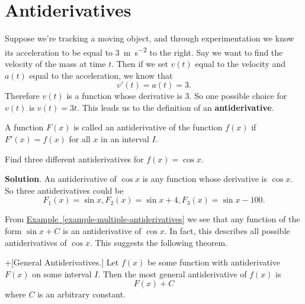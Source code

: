 \documentclass[10pt,]{book}
\newcommand{\terminology}[1]{\textbf{#1}}
\theoremstyle{ptxplainnotitle}
\theoremstyle{ptxplaintitle}
\theoremstyle{ptxplainnotitle}
\theoremstyle{ptxplaintitle}
\theoremstyle{ptxplainnotitle}
\theoremstyle{ptxplaintitle}
\theoremstyle{ptxdefinitionnotitle}
\theoremstyle{ptxdefinitiontitle}
\theoremstyle{ptxdefinitionnotitle}
\theoremstyle{ptxdefinitiontitle}
\theoremstyle{ptxdefinitionnotitle}
\theoremstyle{ptxdefinitiontitle}
\theoremstyle{ptxdefinitionnotitle}
\theoremstyle{ptxdefinitiontitle}
\theoremstyle{ptxdefinitionnotitle}
\theoremstyle{ptxdefinitiontitle}
\numberwithin{equation}{section}
\begin{document}
\section[{Antiderivatives}]{Antiderivatives}\label{section-antiderivatives}
\hypertarget{p-377}{}%
Suppose we're tracking a moving object, and through experimentation we know its acceleration to be equal to \SI{3}{\meter\per\second\tothe{2}} to the right. Say we want to find the velocity of the mass at time \(t\). Then if we set \(v(t)\) equal to the velocity and \(a(t)\) equal to the acceleration, we know that%
\begin{equation*}
v'(t) = a(t) = 3.
\end{equation*}
Therefore \(v(t)\) is a function whose derivative is \(3\). So one possible choice for \(v(t)\) is \(v(t) = 3t\). This leads us to the definition of an \terminology{antiderivative}.%
\begin{definition}[{Antiderivatives.}]\label{definition-antiderivatives}
\hypertarget{p-378}{}%
A function \(F(x)\) is called an antiderivative of the function \(f(x)\) if \(F'(x) = f(x)\) for all \(x\) in an interval \(I\).%
\end{definition}
\begin{example}\label{example-multiple-antiderivatives}
\hypertarget{p-379}{}%
Find three different antiderivatives for \(f(x) = \cos x\).%
\par\smallskip%
\noindent\textbf{Solution}.\hypertarget{solution-84}{}\quad%
\hypertarget{p-380}{}%
An antiderivative of \(\cos x\) is any function whose derivative is \(\cos x\). So three antiderivatives could be%
\begin{equation*}
F_{1}(x) = \sin x, F_{2}(x) = \sin x + 4, F_{3}(x) = \sin x - 100.
\end{equation*}
%
\end{example}
\hypertarget{p-381}{}%
From \hyperref[example-multiple-antiderivatives]{Example~\ref{example-multiple-antiderivatives}} we see that any function of the form \(\sin x +C\) is an antiderivative of \(\cos x\). In fact, this describes all possible antiderivatives of \(\cos x\). This suggests the following theorem.%
\begin{theorem}+[{General Antiderivatives.}]\label{theorem-general-antiderivatives}
\hypertarget{p-382}{}%
Let \(f(x)\) be some function with antiderivative \(F(x)\) on some interval \(I\). Then the most general antiderivative of \(f(x)\) is%
\begin{equation*}
F(x) + C
\end{equation*}
where \(C\) is an arbitrary constant.%
\end{theorem}
\end{document}
